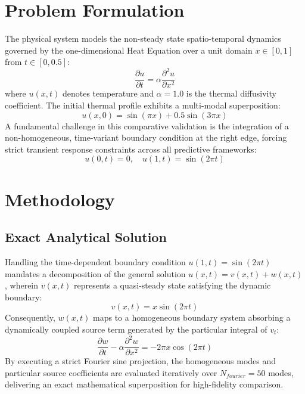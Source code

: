 \documentclass[journal]{IEEEtran}
\begin{document}
\section{Problem Formulation}
The physical system models the non-steady state spatio-temporal dynamics governed by the one-dimensional Heat Equation over a unit domain $x \in [0, 1]$ from $t \in [0, 0.5]$:
\begin{equation}
\frac{\partial u}{\partial t} = \alpha \frac{\partial^2 u}{\partial x^2}
\end{equation}
where $u(x,t)$ denotes temperature and $\alpha = 1.0$ is the thermal diffusivity coefficient.
The initial thermal profile exhibits a multi-modal superposition:
\begin{equation}
u(x,0) = \sin(\pi x) + 0.5\sin(3\pi x)
\end{equation}
A fundamental challenge in this comparative validation is the integration of a non-homogeneous, time-variant boundary condition at the right edge, forcing strict transient response constraints across all predictive frameworks:
\begin{equation}
u(0,t) = 0, \quad u(1,t) = \sin(2\pi t)
\end{equation}

\section{Methodology}
\subsection{Exact Analytical Solution}
Handling the time-dependent boundary condition $u(1,t) = \sin(2\pi t)$ mandates a decomposition of the general solution $u(x,t) = v(x,t) + w(x,t)$, wherein $v(x,t)$ represents a quasi-steady state satisfying the dynamic boundary:
\begin{equation}
v(x,t) = x \sin(2\pi t)
\end{equation}
Consequently, $w(x,t)$ maps to a homogeneous boundary system absorbing a dynamically coupled source term generated by the particular integral of $v_t$:
\begin{equation}
\frac{\partial w}{\partial t} - \alpha \frac{\partial^2 w}{\partial x^2} = -2\pi x \cos(2\pi t)
\end{equation}
By executing a strict Fourier sine projection, the homogeneous modes and particular source coefficients are evaluated iteratively over $N_{fourier}=50$ modes, delivering an exact mathematical superposition for high-fidelity comparison.
\end{document}
